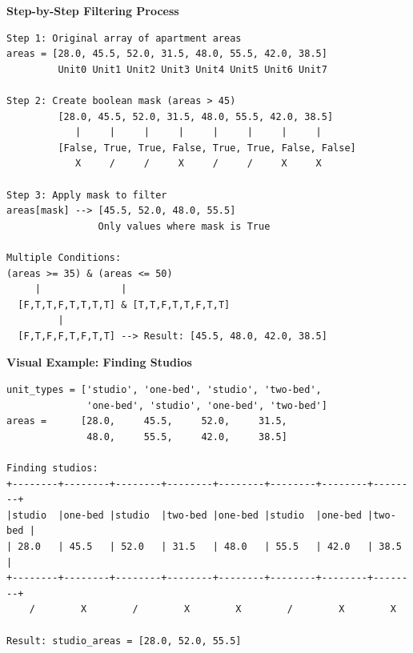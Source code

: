 \begin{tcolorbox}[
    title=How Filtering Works (Visual),
    colframe=orange,
    colback = white,
    arc=2mm
]
\textbf{Step-by-Step Filtering Process}
\begin{lstlisting}[basicstyle=\ttfamily\footnotesize,breaklines=true,columns=fullflexible,keepspaces=true,xleftmargin=0pt]
Step 1: Original array of apartment areas
areas = [28.0, 45.5, 52.0, 31.5, 48.0, 55.5, 42.0, 38.5]
         Unit0 Unit1 Unit2 Unit3 Unit4 Unit5 Unit6 Unit7

Step 2: Create boolean mask (areas > 45)
         [28.0, 45.5, 52.0, 31.5, 48.0, 55.5, 42.0, 38.5]
            |     |     |     |     |     |     |     |
         [False, True, True, False, True, True, False, False]
            X     /     /     X     /     /     X     X

Step 3: Apply mask to filter
areas[mask] --> [45.5, 52.0, 48.0, 55.5]
                Only values where mask is True

Multiple Conditions:
(areas >= 35) & (areas <= 50)
     |              |
  [F,T,T,F,T,T,T,T] & [T,T,F,T,T,F,T,T]
         |
  [F,T,F,F,T,F,T,T] --> Result: [45.5, 48.0, 42.0, 38.5]

\end{lstlisting}

\textbf{Visual Example: Finding Studios}
\begin{lstlisting}[basicstyle=\ttfamily\footnotesize,breaklines=true,columns=fullflexible,keepspaces=true,xleftmargin=0pt]
unit_types = ['studio', 'one-bed', 'studio', 'two-bed', 
              'one-bed', 'studio', 'one-bed', 'two-bed']
areas =      [28.0,     45.5,     52.0,     31.5,
              48.0,     55.5,     42.0,     38.5]

Finding studios:
+--------+--------+--------+--------+--------+--------+--------+--------+
|studio  |one-bed |studio  |two-bed |one-bed |studio  |one-bed |two-bed |
| 28.0   | 45.5   | 52.0   | 31.5   | 48.0   | 55.5   | 42.0   | 38.5   |
+--------+--------+--------+--------+--------+--------+--------+--------+
    /        X        /        X        X        /        X        X
    
Result: studio_areas = [28.0, 52.0, 55.5]

\end{lstlisting}
\end{tcolorbox}

